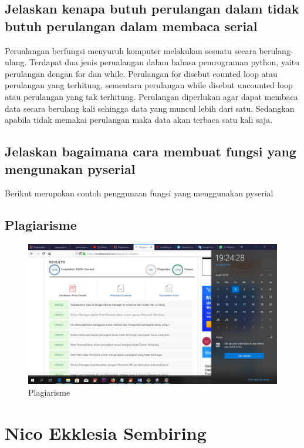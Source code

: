 \subsection{Jelaskan kenapa butuh perulangan dalam tidak butuh perulangan dalam membaca serial}
Perualangan berfungsi menyuruh komputer melakukan sesuatu secara berulang-ulang. Terdapat dua jenis perualangan dalam bahasa pemrograman python, yaitu perulangan dengan for dan while.
Perulangan for disebut counted loop  atau perulangan yang terhitung, sementara perulangan while disebut uncounted loop atau perulangan yang tak terhitung. Perulangan diperlukan agar dapat membaca data secara berulang kali sehingga data yang muncul lebih dari satu.  Sedangkan apabila tidak memakai perulangan maka data akan terbaca satu kali saja.

\subsection{Jelaskan bagaimana cara membuat fungsi yang mengunakan pyserial}
Berikut merupakan contoh penggunaan fungsi yang menggunakan pyserial


\subsection{Plagiarisme}
\begin{figure}[h]
\centering
\includegraphics[scale=0.2]{figures/5/Teori/1174002/plagiat.png}
\caption{Plagiarisme}
\label{fig:plagiat}
\end{figure}

\section{Nico Ekklesia Sembiring}
